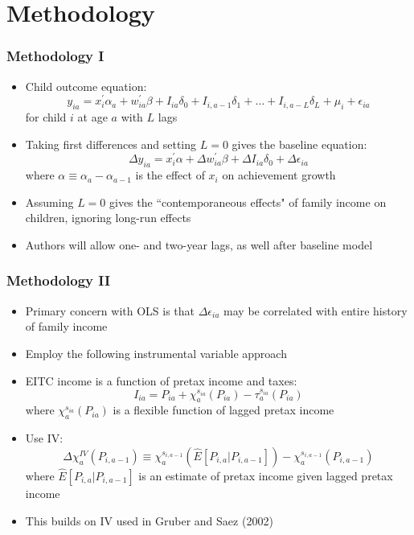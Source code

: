 \documentclass{beamer}
\begin{document}
\section{Methodology}


\begin{frame}
\frametitle{Methodology I}
\begin{itemize}
	\item Child outcome equation:
	\begin{equation}
		y_{ia} = x_i^' \alpha_a + w_{ia}^' \beta + I_{ia}\delta_0 + I_{i, a-1}\delta_1 + \dots + I_{i, a-L}\delta_L + \mu_i + \epsilon_{ia} 
	\end{equation}
	for child $i$ at age $a$ with $L$ lags %
	\item Taking first differences and setting $L=0$ gives the baseline equation:
	\begin{equation}
		\Delta y_{ia} = x_i^' \alpha + \Delta w_{ia}^' \beta + \Delta I_{ia}\delta_0 + \Delta \epsilon_{ia}
	\end{equation}
	where $ \alpha \equiv \alpha_a - \alpha_{a-1} $ is the effect of $x_i$ on achievement growth
	\item Assuming $L=0$ gives the ``contemporaneous effects" of family income on children, ignoring long-run effects
	\item Authors will allow one- and two-year lags, as well after baseline model
\end{itemize}
\end{frame}

\begin{frame}
\frametitle{Methodology II}
\begin{itemize}
	\item Primary concern with OLS is that $\Delta \epsilon_{ia}$ may be correlated with entire history of family income
	\item Employ the following instrumental variable approach
	\item EITC income is a function of pretax income and taxes:
	\begin{equation*}
		I_{ia} = P_{ia} + \chi_a^{s_{ia}}(P_{ia}) - \tau_a^{s_{ia}}(P_{ia})
	\end{equation*}
	where $\chi_a^{s_{ia}}(P_{ia})$ is a flexible function of lagged pretax income
	\item Use IV:  
	\begin{equation*}
		\Delta \chi_a^{IV}(P_{i, a-1}) \equiv \chi_a^{s_{i, a-1}}(\hat{E}\left[P_{i,a} | P_{i, a-1} \right]) -  \chi_a^{s_{i, a-1}}(P_{i,a-1})
	\end{equation*}
	where $ \hat{E}\left[P_{i,a} | P_{i, a-1} \right] $ is an estimate of pretax income given lagged pretax income
	\item This builds on IV used in Gruber and Saez (2002)
\end{itemize}
\end{frame}
\end{document}
